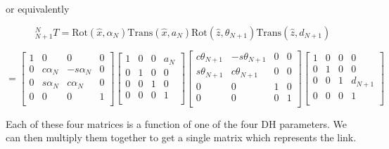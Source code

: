 or equivalently

\[
^{N}_{N+1}T =  \mathrm{Rot}(\hat{x},\alpha_{N})\mathrm{Trans}(\hat{x},a_{N})\mathrm{Rot}(\hat{z}, \theta_{N+1})\mathrm{Trans}(\hat{z}, d_{N+1})
\]

\[
= \left[
   \begin{array}{cccc}
    1     &     0     &     0     &      0   \\
    0     &     c\alpha_{N}     &     -s\alpha_{N}     &      0   \\
    0     &     s\alpha_{N}     &      c\alpha_{N}     &      0   \\
    0     &     0     &     0     &      1   \\
   \end{array}
  \right ]
   \left[
   \begin{array}{cccc}
    1     &     0     &     0     &      a_{N}   \\
    0     &     1     &     0     &      0   \\
    0     &     0     &     1     &      0   \\
    0     &     0     &     0     &      1   \\
   \end{array}
  \right ]
   \left[
   \begin{array}{cccc}
    c\theta_{N+1}     &     -s\theta_{N+1}    &     0     &      0   \\
    s\theta_{N+1}     &      c\theta_{N+1}    &     0     &      0   \\
    0     &     0     &     1     &      0   \\
    0     &     0     &     0     &      1   \\
   \end{array}
  \right ]
   \left[
   \begin{array}{cccc}
    1     &     0     &     0     &      0   \\
    0     &     1     &     0     &      0   \\
    0     &     0     &     1     &      d_{N+1}   \\
    0     &     0     &     0     &      1   \\
   \end{array}
  \right ]
  \]

Each of these four matrices is a function of one of the four DH parameters.   We can then multiply them together to get a single matrix which represents the link.

